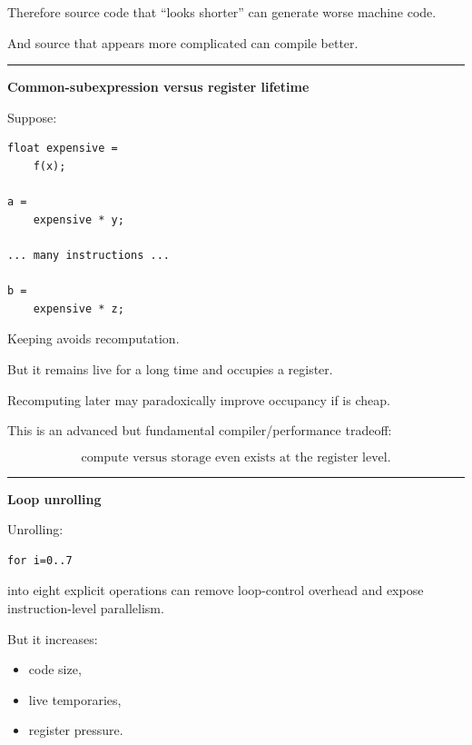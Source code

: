 Therefore source code that ``looks shorter'' can generate worse machine code.

And source that appears more complicated can compile better.

\begin{center}\rule{0.5\linewidth}{0.5pt}\end{center}

\textbf{Common-subexpression versus register lifetime}

Suppose:

\protect{}\label{p10-cse}%
\begin{verbatim}
float expensive =
    f(x);

a =
    expensive * y;

... many instructions ...

b =
    expensive * z;
\end{verbatim}

Keeping  avoids recomputation.

But it remains live for a long time and occupies a register.

Recomputing  later may paradoxically improve occupancy if  is cheap.

This is an advanced but fundamental compiler/performance tradeoff:

\[
\boxed{
\text{compute versus storage even exists at the register level}.
}
\]

\begin{center}\rule{0.5\linewidth}{0.5pt}\end{center}

\textbf{Loop unrolling}

Unrolling:

\protect{}\label{p10-unroll}%
\begin{verbatim}
for i=0..7
\end{verbatim}

into eight explicit operations can remove loop-control overhead and expose instruction-level parallelism.

But it increases:

\begin{itemize}
\tightlist
\item
  code size,
\item
  live temporaries,
\item
  register pressure.
\end{itemize}

